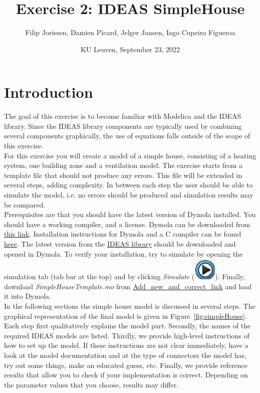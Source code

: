 \documentclass[10pt,a4paper]{article}
\begin{document}
\title{Exercise 2: IDEAS SimpleHouse}
\author{Filip Jorissen, Damien Picard, Jelger Jansen, Iago Cupeiro Figueroa}
\date{KU Leuven, September 23, 2022}
\maketitle


\doclicenseThis


\section*{Introduction}
The goal of this exercise is to become familiar with 
Modelica and the IDEAS library. 
Since the IDEAS library components are typically used
by combining several components graphically, the use of 
equations falls outside of the scope of this exercise.\\

For this exercise you will create a model of a simple house,
consisting of a heating system, one building zone 
and a ventilation model. 
The exercise starts from a template file that should 
not produce any errors. This file will be extended in
several steps, adding complexity.
In between each step the user should be able to simulate the
model, i.e. no errors should be produced and simulation results 
may be compared.\\

Prerequisites are that you should have the latest version of Dymola
installed. You should have a working compiler, and a license. 
Dymola can be downloaded from 
\href{http://www.3ds.com/products-services/catia/products/dymola/trial-version/}{this link}. 
Installation instructions for Dymola and a C compiler can be found 
\href{http://www.3ds.com/fileadmin/PRODUCTS/CATIA/DYMOLA/PDF/Installation.pdf}{here}.
The latest version from the \href{https://github.com/open-ideas/IDEAS}{IDEAS library} should be downloaded and opened in Dymola. 
To verify your installation, try to simulate  by opening the simulation tab (tab bar at the top) and by clicking \textit{Simulate} (\includegraphics[scale=0.35]{simulate.png}). Finally, download 
\textit{SimpleHouseTemplate.mo} from \url{Add_new_and_correct_link}
and load it into Dymola.\\

In the following sections the simple house model is discussed 
in several steps. The graphical representation of the final model is 
given in Figure~\ref{fig:simpleHouse}.
Each step first qualitatively explains the model part.
Secondly, the names of the required IDEAS models 
are listed.
Thirdly, we provide high-level instructions of how to
set up the model.
If these instructions are not clear immediately, 
have a look at the model documentation and at the type of
connectors the model has, 
try out some things, 
make an educated guess, etc.
Finally, we provide reference results that allow you to check
if your implementation is correct. 
Depending on the parameter values that you choose, results
may differ.
 
\end{document}
